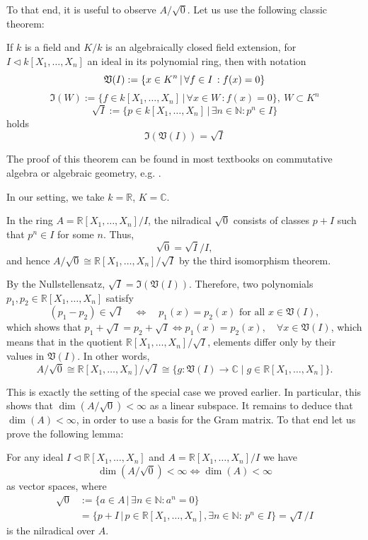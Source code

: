 \documentclass{amsart}
\begin{document}
To that end, it is useful to observe $A/\sqrt{0}$. Let us use the following classic theorem:

\begin{theorem}
If $k$ is a field and $K/k$ is an algebraically closed field extension, for $I \triangleleft k[X_1, \ldots , X_n]$ an ideal in its polynomial ring, then with notation 
\[
\mathfrak{V}(I):=\{x\in K^n \, | \, \forall f \in I \, : f(x)=0 \} \\
\]
\[
\mathfrak{I}(W):=\{ f \in k[X_1, \ldots , X_n] \, | \, \forall x \in W \, : f(x) = 0\},\: W \subset K^n
\] 
\[
\sqrt{I} := \{ p \in k[X_1, \ldots , X_n] \, | \, \exists n \in \mathbb{N}: p^n \in I\}
\]
holds 
\[
\mathfrak{I}(\mathfrak{V}(I))=\sqrt{I}
\]
\end{theorem}
The proof of this theorem can be found in most textbooks on commutative algebra or algebraic geometry, e.g. \cite[Chapter 4, \S 1, Theorem~2, p.~179]{cox_little_oshea2015book}.

In our setting, we take \( k = \mathbb{R} \), \( K = \mathbb{C} \). 

In the ring \( A = \mathbb{R}[X_1, \ldots, X_n]/I \), the nilradical \( \sqrt{0} \) consists of classes \( p + I \) such that \( p^n \in I \) for some \( n \). Thus,
\[
\sqrt{0} = \sqrt{I}/I,
\]
and hence \( A/\sqrt{0} \cong \mathbb{R}[X_1, \ldots, X_n]/\sqrt{I} \) by the third isomorphism theorem.

By the Nullstellensatz, \( \sqrt{I} = \mathfrak{I}(\mathfrak{V}(I)) \). Therefore, two polynomials \( p_1, p_2 \in \mathbb{R}[X_1, \ldots, X_n] \) satisfy
\[
(p_1 - p_2) \in \sqrt{I} \quad \Leftrightarrow \quad p_1(x) = p_2(x) \text{ for all } x \in \mathfrak{V}(I),
\]
which shows that $p_1+\sqrt{I} = p_2+\sqrt{I} \Leftrightarrow p_1(x)=p_2(x), \quad \forall x \in \mathfrak{V}(I)$, which means that in the quotient \( \mathbb{R}[X_1, \ldots, X_n]/\sqrt{I} \), elements differ only by their values in \( \mathfrak{V}(I) \). In other words,
\[
A/\sqrt{0} \cong \mathbb{R}[X_1, \ldots, X_n]/\sqrt{I} \cong \{g : \mathfrak{V}(I) \to \mathbb{C} \mid g \in \mathbb{R}[X_1, \ldots, X_n] \}.
\]

This is exactly the setting of the special case we proved earlier. In particular, this shows that $\dim(A/\sqrt{0}) < \infty$ as a linear subspace. It remains to deduce that $\dim(A) < \infty$, in order to use a basis for the Gram matrix. To that end let us prove the following lemma:

\begin{lemma}
For any ideal $I \triangleleft \mathbb{R}[X_1, \ldots , X_n]$ and $A = \mathbb{R}[X_1, \ldots , X_n]/I$ we have
\[
\dim(A/\sqrt{0})<\infty \Leftrightarrow \dim(A)<\infty
\]
as vector spaces, where 
\begin{align*}
    \sqrt{0}&:=\{a \in A \, | \, \exists n \in \mathbb{N}: a^n = 0\} \\
    &= \{ p+I \, | \, p \in \mathbb{R}[X_1, \ldots , X_n], \exists n \in \mathbb{N}: \, p^n \in I\} = \sqrt{I}/I
\end{align*}
is the nilradical over $A$.
\end{lemma}
\end{document}
